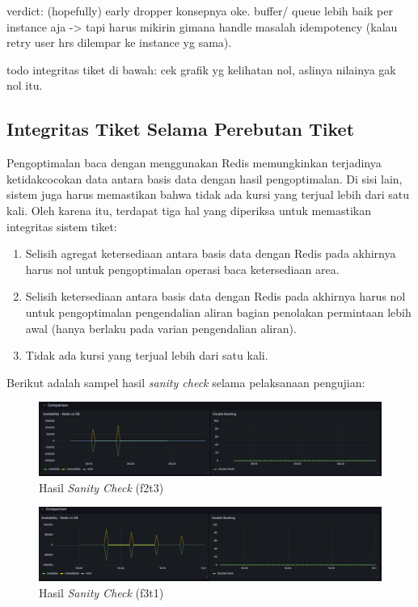 verdict: (hopefully) early dropper konsepnya oke. buffer/ queue lebih baik per instance aja -> tapi harus mikirin gimana handle masalah idempotency (kalau retry user hrs dilempar ke instance yg sama).

todo integritas tiket di bawah: cek grafik yg kelihatan nol, aslinya nilainya gak nol itu.

\subsection{Integritas Tiket Selama Perebutan Tiket}

Pengoptimalan baca dengan menggunakan Redis memungkinkan terjadinya ketidakcocokan data antara basis data dengan hasil pengoptimalan. Di sisi lain, sistem juga harus memastikan bahwa tidak ada kursi yang terjual lebih dari satu kali. Oleh karena itu, terdapat tiga hal yang diperiksa untuk memastikan integritas sistem tiket:

\begin{enumerate}
    \item Selisih agregat ketersediaan antara basis data dengan Redis pada akhirnya harus nol untuk pengoptimalan operasi baca ketersediaan area.
    \item Selisih ketersediaan antara basis data dengan Redis pada akhirnya harus nol untuk pengoptimalan pengendalian aliran bagian penolakan permintaan lebih awal (hanya berlaku pada varian pengendalian aliran).
    \item Tidak ada kursi yang terjual lebih dari satu kali.
\end{enumerate}

Berikut adalah sampel hasil \textit{sanity check} selama pelaksanaan pengujian:

\begin{figure}[htbp]
    \centering
    \includegraphics[width=1\textwidth]{resources/chapter-4/sanity-f2t3.png}
    \caption{Hasil \textit{Sanity Check} (f2t3)}
    \label{fig:sanity-f2t3}
\end{figure}

\begin{figure}[htbp]
    \centering
    \includegraphics[width=1\textwidth]{resources/chapter-4/sanity-f3t1.png}
    \caption{Hasil \textit{Sanity Check} (f3t1)}
    \label{fig:sanity-f3t1}
\end{figure}

